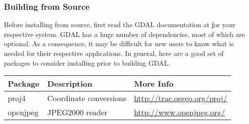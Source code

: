 \subsubsection*{Building from Source}

Before installing from source, first read the GDAL documentation 
at \href{http://gdal.org} for your respective system.  GDAL 
has a huge number of dependencies, most of which are optional. 
As a consequence, it may be difficult for new users to know what is needed
for their respective applications.  In general, here are a good set of
packages to consider installing prior to building GDAL.

\begin{table}[h!]
\begin{tabular}{|l|l|l|}\hline
\textbf{Package} & \textbf{Description}   & \textbf{More Info} \\\hline
proj4            & Coordinate conversions & \url{http://trac.osgeo.org/proj/} \\\hline
openjpeg         & JPEG2000 reader        & \url{http://www.openjpeg.org/} \\\hline
\end{tabular}
\end{table}

